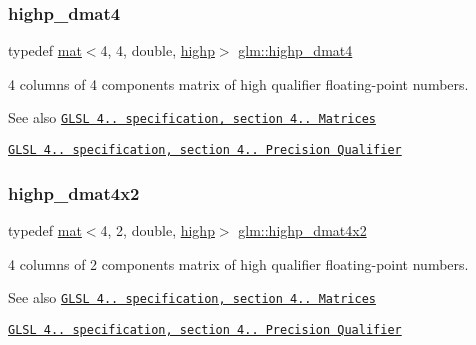 \subsubsection{\texorpdfstring{highp\+\_\+dmat4}{highp\_dmat4}}
{\footnotesize\ttfamily typedef \hyperlink{structglm_1_1mat}{mat}$<$4, 4, double, \hyperlink{namespaceglm_a36ed105b07c7746804d7fdc7cc90ff25ac6f7eab42eacbb10d59a58e95e362074}{highp}$>$ \hyperlink{group__core__precision_ga878bb8f4881dbf688ab9bbb5e2944a54}{glm\+::highp\+\_\+dmat4}}

4 columns of 4 components matrix of high qualifier floating-\/point numbers.

\begin{DoxySeeAlso}{See also}
\href{http://www.opengl.org/registry/doc/GLSLangSpec.4.20.8.pdf}{\tt G\+L\+SL 4.. specification, section 4.. Matrices} 

\href{http://www.opengl.org/registry/doc/GLSLangSpec.4.20.8.pdf}{\tt G\+L\+SL 4.. specification, section 4.. Precision Qualifier} 
\end{DoxySeeAlso}
\mbox{\label{group__core__precision_ga22c6b4fe5bb2e33a3cfa1c026803dd68}} 
\subsubsection{\texorpdfstring{highp\+\_\+dmat4x2}{highp\_dmat4x2}}
{\footnotesize\ttfamily typedef \hyperlink{structglm_1_1mat}{mat}$<$4, 2, double, \hyperlink{namespaceglm_a36ed105b07c7746804d7fdc7cc90ff25ac6f7eab42eacbb10d59a58e95e362074}{highp}$>$ \hyperlink{group__core__precision_ga22c6b4fe5bb2e33a3cfa1c026803dd68}{glm\+::highp\+\_\+dmat4x2}}

4 columns of 2 components matrix of high qualifier floating-\/point numbers.

\begin{DoxySeeAlso}{See also}
\href{http://www.opengl.org/registry/doc/GLSLangSpec.4.20.8.pdf}{\tt G\+L\+SL 4.. specification, section 4.. Matrices} 

\href{http://www.opengl.org/registry/doc/GLSLangSpec.4.20.8.pdf}{\tt G\+L\+SL 4.. specification, section 4.. Precision Qualifier} 
\end{DoxySeeAlso}
\mbox{\label{group__core__precision_ga9a5dab260df6e8c46c747bac0b8d2f38}} 
